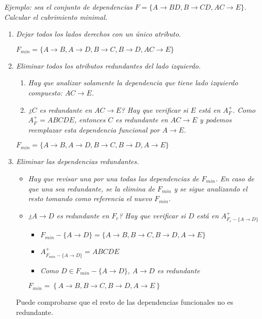 \documentclass[a4paper, twoside]{article}
\begin{document}
\emph{Ejemplo: sea el conjunto de dependencias $F=\{A\to BD,B\to CD,AC\to E\}$.
Calcular el cubrimiento minimal.}
\begin{enumerate}
\item \emph{Dejar todos los lados derechos con un único atributo.}


\emph{$F_{min}=\{A\to B,A\to D,B\to C,B\to D,AC\to E\}$}

\item \emph{Eliminar todos los atributos redundantes del lado izquierdo.}

\begin{enumerate}
\item \emph{Hay que analizar solamente la dependencia que tiene lado izquierdo
compuesto: $AC\to E$.}
\item \emph{¿$C$ es redundante en $AC\to E$? Hay que verificar si $E$
está en $A_{F}^{+}$. Como $A_{F}^{+}=ABCDE$, entonces $C$ es redundante
en $AC\to E$ y podemos reemplazar esta dependencia funcional por
$A\to E$.}
\end{enumerate}

\emph{$F_{min}=\{A\to B,A\to D,B\to C,B\to D,A\to E\}$}

\item \emph{Eliminar las dependencias redundantes.}

\begin{itemize}
\item \emph{Hay que revisar una por una todas las dependencias de $F_{min}$.
En caso de que una sea redundante, se la elimina de $F_{min}$ y se
sigue analizando el resto tomando como referencia el nuevo $F_{min}$. }
\item \emph{¿$A\to D$ es redundante en $F_{c}$? Hay que verificar si $D$
está en $A_{F_{c}-\{A\to D\}}^{+}$}

\begin{itemize}
\item \emph{$F_{min}-\{A\to D\}=\{A\to B,B\to C,B\to D,A\to E\}$}
\item \emph{$A_{F_{min}-\{A\to D\}}^{+}=ABCDE$}
\item \emph{Como $D\in F_{min}-\{A\to D\}$, $A\to D$ es redundante}
\end{itemize}

$F_{min}=\left\{ A\to B,B\to C,B\to D,A\to E\right\} $

\end{itemize}

Puede comprobarse que el resto de las dependencias funcionales no
es redundante.

\end{enumerate}
\end{document}
